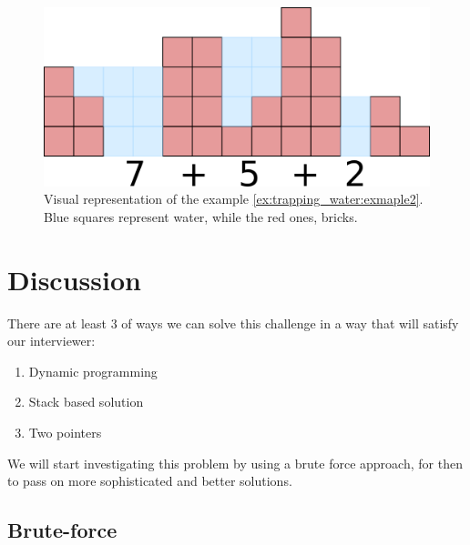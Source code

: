 \begin{figure}
		\label{fig:trapping_water_example2}
		\centering
		\includegraphics[scale=1.0]{sources/trapping_water/images/example2}
		\caption{Visual representation of the example \ref{ex:trapping_water:exmaple2}. Blue squares represent water, while the red ones, bricks.}
\end{figure}

%
%	

\section{Discussion}
\label{trapping_water:sec:discussion}
There are at least $3$ of ways we can solve this challenge in a way that will satisfy our interviewer:

\begin{enumerate}
	\item Dynamic programming
	\item Stack based solution
	\item Two pointers
\end{enumerate}
We will start investigating this problem by using a brute force approach, for then to pass on more sophisticated and better solutions.


\subsection{Brute-force}
\label{trapping_water:sec:bruteforce}

